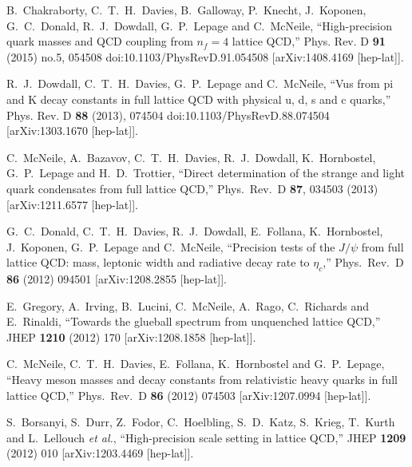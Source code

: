 \begin{thebibliography}{130}
B.~Chakraborty, C.~T.~H.~Davies, B.~Galloway, P.~Knecht, J.~Koponen,
G.~C.~Donald, R.~J.~Dowdall, G.~P.~Lepage and C.~McNeile,
``High-precision quark masses and QCD coupling from $n_f=4$ lattice
QCD,''
Phys. Rev. D \textbf{91} (2015) no.5, 054508
doi:10.1103/PhysRevD.91.054508
[arXiv:1408.4169 [hep-lat]].

R.~J.~Dowdall, C.~T.~H.~Davies, G.~P.~Lepage and C.~McNeile,
``Vus from pi and K decay constants in full lattice QCD with physical
u, d, s and c quarks,''
Phys. Rev. D \textbf{88} (2013), 074504
doi:10.1103/PhysRevD.88.074504
[arXiv:1303.1670 [hep-lat]].


  C.~McNeile, A.~Bazavov, C.~T.~H.~Davies, R.~J.~Dowdall,
  K.~Hornbostel, G.~P.~Lepage and H.~D.~Trottier,
  ``Direct determination of the strange and light quark condensates
  from full lattice QCD,''
  Phys.\ Rev.\ D {\bf 87}, 034503 (2013)
  [arXiv:1211.6577 [hep-lat]].


  G.~C.~Donald, C.~T.~H.~Davies, R.~J.~Dowdall, E.~Follana,
  K.~Hornbostel, J.~Koponen, G.~P.~Lepage and C.~McNeile,
  ``Precision tests of the $J/{\psi}$ from full lattice QCD: mass,
  leptonic width and radiative decay rate to ${\eta}_c$,''
  Phys.\ Rev.\ D {\bf 86} (2012) 094501
  [arXiv:1208.2855 [hep-lat]].

  E.~Gregory, A.~Irving, B.~Lucini, C.~McNeile, A.~Rago, C.~Richards
  and E.~Rinaldi,
  ``Towards the glueball spectrum from unquenched lattice QCD,''
  JHEP {\bf 1210} (2012) 170
  [arXiv:1208.1858 [hep-lat]].

  C.~McNeile, C.~T.~H.~Davies, E.~Follana, K.~Hornbostel and
  G.~P.~Lepage,
  ``Heavy meson masses and decay constants from relativistic heavy
  quarks in full lattice QCD,''
  Phys.\ Rev.\ D {\bf 86} (2012) 074503
  [arXiv:1207.0994 [hep-lat]].

 S.~Borsanyi, S.~Durr, Z.~Fodor, C.~Hoelbling, S.~D.~Katz, S.~Krieg,
 T.~Kurth and L.~Lellouch {\it et al.},
  ``High-precision scale setting in lattice QCD,''
  JHEP {\bf 1209} (2012) 010
  [arXiv:1203.4469 [hep-lat]].



\end{thebibliography}
